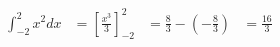 \documentclass[preview]{standalone}
\begin{document}
\begin{align*}
\int_{-2}^{2} x^2 dx &= \left[ \frac{x^3}{3} \right]_{-2}^{2} &= \frac{8}{3} - \left(-\frac{8}{3}\right) &= \frac{16}{3}
\end{align*}
\end{document}
